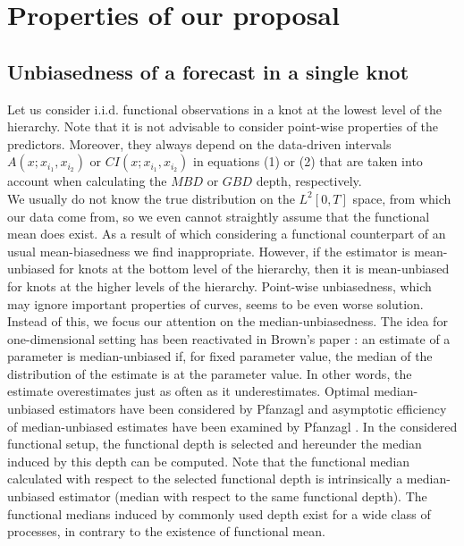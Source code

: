 \documentclass[12pt,a4paper]{article}
\numberwithin{equation}{section}
\begin{document}
\section{Properties of our proposal} 
\label{sec:4}
\subsection{Unbiasedness of a forecast in a single knot}
Let us consider i.i.d. functional observations in a knot at the lowest level of the hierarchy. 
Note that it is not advisable to consider point-wise properties of the predictors. Moreover, they always depend on the data-driven intervals $A(x;x_{i_1},x_{i_2})$ or $CI(x;x_{i_1},x_{i_2})$ in equations (1) or (2) that are taken into account when calculating the $MBD$ or $GBD$ depth, respectively.
\\ We usually do not know the true distribution on the $L^2[0,T]$ space, from which our data come from, so we even cannot straightly assume that the functional mean does exist. As a result of which considering a functional counterpart of an usual mean-biasedness we find inappropriate. 
However, if the estimator is mean-unbiased for knots at the bottom level of the hierarchy, then it is mean-unbiased for knots at the higher levels of the hierarchy. Point-wise unbiasedness, which may ignore important properties of curves, seems to be even worse solution. Instead of this, we focus our attention on the median-unbiasedness. The idea for one-dimensional setting has been reactivated in Brown's paper \cite{brown}: an estimate of a parameter is median-unbiased if, for fixed parameter value, the median of the distribution of the estimate is at the parameter value. In other words, the estimate overestimates just as often as it underestimates. Optimal median-unbiased estimators have been considered by Pfanzagl \cite{pfan79} and asymptotic efficiency of median-unbiased estimates have been examined by Pfanzagl \cite{pfan70}. 
In the considered functional setup, the functional depth is selected and hereunder the median induced by this depth can be computed. Note that the functional median calculated with respect to the selected functional depth is intrinsically a median-unbiased estimator (median with respect to the same functional depth). The functional medians induced by commonly used depth exist for a wide class of processes, in contrary to the existence of functional mean.  
\end{document}
